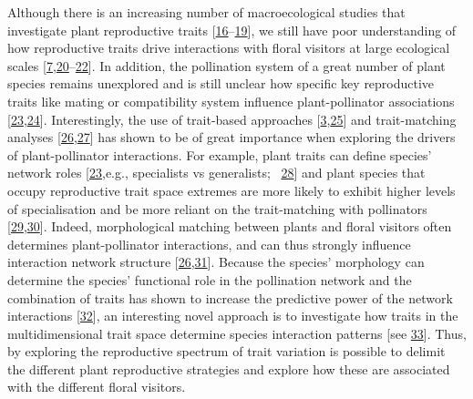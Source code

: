 \documentclass[
  12pt,
  a4paper,
]{article}
\begin{document}
Although there is an increasing number of macroecological studies that investigate plant reproductive traits {[}\protect\hyperlink{ref-baude2016}{16}--\protect\hyperlink{ref-moeller2017}{19}{]}, we still have poor understanding of how reproductive traits drive interactions with floral visitors at large ecological scales {[}\protect\hyperlink{ref-salguero2016}{7},\protect\hyperlink{ref-sargent2008}{20}--\protect\hyperlink{ref-ruger2018}{22}{]}. In addition, the pollination system of a great number of plant species remains unexplored and is still unclear how specific key reproductive traits like mating or compatibility system influence plant-pollinator associations {[}\protect\hyperlink{ref-tur2013}{23},\protect\hyperlink{ref-devaux2014}{24}{]}. Interestingly, the use of trait-based approaches {[}\protect\hyperlink{ref-fenster2004}{3},\protect\hyperlink{ref-rosas2014}{25}{]} and trait-matching analyses {[}\protect\hyperlink{ref-stang2009}{26},\protect\hyperlink{ref-bartomeus2016}{27}{]} has shown to be of great importance when exploring the drivers of plant-pollinator interactions. For example, plant traits can define species' network roles {[}\protect\hyperlink{ref-tur2013}{23},e.g., specialists vs generalists;~ \protect\hyperlink{ref-lazaro2013}{28}{]} and plant species that occupy reproductive trait space extremes are more likely to exhibit higher levels of specialisation and be more reliant on the trait-matching with pollinators {[}\protect\hyperlink{ref-junker2013}{29},\protect\hyperlink{ref-coux2016}{30}{]}. Indeed, morphological matching between plants and floral visitors often determines plant-pollinator interactions, and can thus strongly influence interaction network structure {[}\protect\hyperlink{ref-stang2009}{26},\protect\hyperlink{ref-ibanez2012}{31}{]}. Because the species' morphology can determine the species' functional role in the pollination network and the combination of traits has shown to increase the predictive power of the network interactions {[}\protect\hyperlink{ref-eklof2013}{32}{]}, an interesting novel approach is to investigate how traits in the multidimensional trait space determine species interaction patterns {[}see \protect\hyperlink{ref-dehling2016}{33}{]}. Thus, by exploring the reproductive spectrum of trait variation is possible to delimit the different plant reproductive strategies and explore how these are associated with the different floral visitors.
\end{document}
